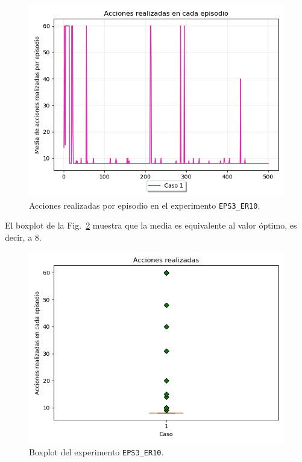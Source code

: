 \begin{figure}
    \centering
    \includegraphics[scale=0.4]{cap5_experimentacion/images/dim5_lr0.01_ep0.9_acciones.png}
    \caption{Acciones realizadas por episodio en el experimento \texttt{EPS3\_ER10}.}
    \label{fig:dim5_lr0.01_ep0.9_acciones}
\end{figure}

El boxplot de la Fig.~\ref{fig:dim5_lr0.01_ep0.9_boxplot} muestra que la media es equivalente al valor óptimo, es decir, a 8. \\

\begin{figure}
    \centering
    \includegraphics[scale=0.4]{cap5_experimentacion/images/dim5_lr0.01_ep0.9_boxplot.png}
    \caption{Boxplot del experimento \texttt{EPS3\_ER10}.}
    \label{fig:dim5_lr0.01_ep0.9_boxplot}
\end{figure}
 
